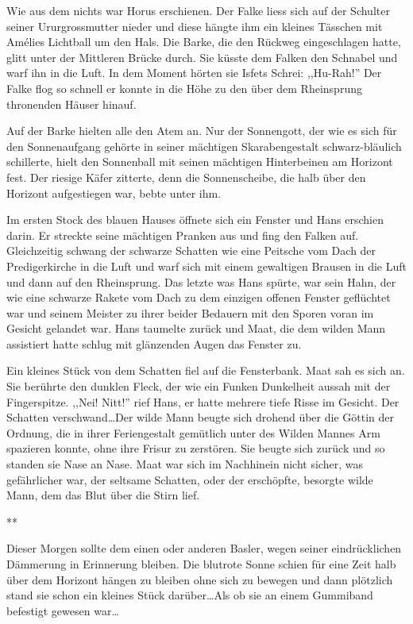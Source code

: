 \documentclass[11pt,titlepage,a5paper]{book}
\newcommand{\sterne}{\par{\centering ***\par}}
\begin{document}
Wie aus dem nichts war Horus erschienen. Der Falke liess sich auf der Schulter seiner Ururgrossmutter nieder und diese hängte ihm ein kleines Tässchen mit Amélies Lichtball um den Hals.  Die Barke, die den Rückweg eingeschlagen hatte, glitt unter der Mittleren Brücke durch. Sie küsste dem Falken den Schnabel und warf ihn in die Luft.
In dem Moment hörten sie Isfets Schrei: ,,Hu-Rah!'' Der Falke flog so schnell er konnte in die Höhe zu den über dem Rheinsprung thronenden Häuser hinauf. 

Auf der Barke hielten alle den Atem an. Nur der Sonnengott, der wie es sich für den Sonnenaufgang gehörte in seiner mächtigen Skarabengestalt schwarz-bläulich schillerte, hielt den Sonnenball mit seinen mächtigen Hinterbeinen am Horizont fest. Der riesige Käfer zitterte, denn die Sonnenscheibe, die halb über den Horizont aufgestiegen war, bebte unter ihm. 

Im ersten Stock des blauen Hauses öffnete sich ein Fenster und Hans erschien darin. Er streckte seine mächtigen Pranken aus und fing den Falken auf. Gleichzeitig schwang der schwarze Schatten wie eine Peitsche vom Dach der Predigerkirche in die Luft und warf sich mit einem gewaltigen Brausen in die Luft und dann auf den Rheinsprung. Das letzte was Hans spürte, war sein Hahn, der wie eine schwarze Rakete vom Dach zu dem einzigen offenen Fenster geflüchtet war und seinem Meister zu ihrer beider Bedauern mit den Sporen voran im Gesicht gelandet war. Hans taumelte zurück und Maat, die dem wilden Mann assistiert hatte schlug mit glänzenden Augen das Fenster zu.

Ein kleines Stück von dem Schatten fiel auf die Fensterbank. Maat sah es sich an. Sie berührte den dunklen Fleck, der wie ein Funken Dunkelheit aussah mit der Fingerspitze. ,,Nei! Nitt!'' rief Hans, er hatte mehrere tiefe Risse im Gesicht. Der Schatten verschwand\dots Der wilde Mann beugte sich drohend über die Göttin der Ordnung, die in ihrer Feriengestalt gemütlich unter des Wilden Mannes Arm spazieren konnte, ohne ihre Frisur zu zerstören. Sie beugte sich zurück und so standen sie Nase an Nase. Maat war sich im Nachhinein nicht sicher, was gefährlicher war, der  seltsame Schatten, oder der erschöpfte, besorgte wilde Mann, dem das Blut über die Stirn lief.

\sterne

Dieser Morgen sollte dem einen oder anderen Basler, wegen seiner eindrücklichen Dämmerung in Erinnerung bleiben. Die blutrote Sonne schien für eine Zeit halb über dem Horizont hängen zu bleiben ohne sich zu bewegen und dann plötzlich stand sie schon ein kleines Stück darüber\dots Als ob sie an einem Gummiband befestigt gewesen war\dots 
\end{document}
